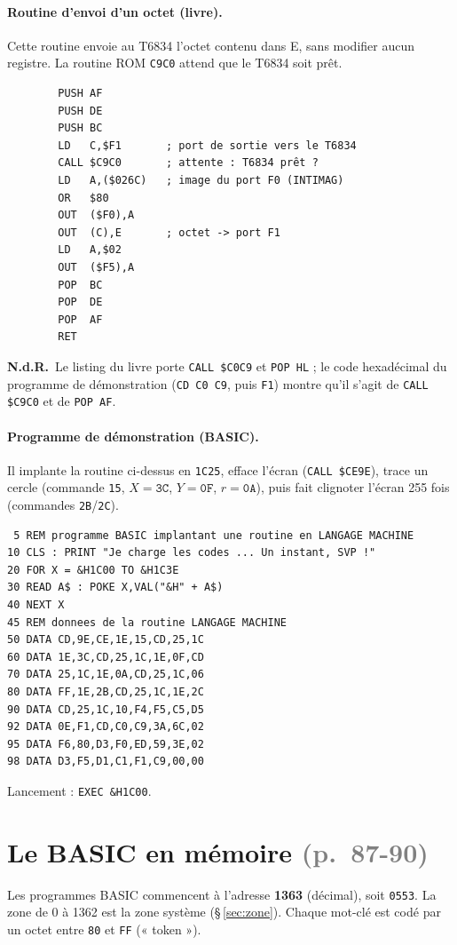 \documentclass[a4paper,10pt]{article}
\newcommand{\hex}[1]{\texttt{#1}}
\newcommand{\reg}[1]{\textsf{#1}}
\newcommand{\pg}[1]{\texorpdfstring{\textcolor{gray}{\small(p.~#1)}}{}}
\newcommand{\nota}[1]{\textcolor{red!60!black}{\small\textbf{N.d.R.}~#1}}
\begin{document}
\paragraph{Routine d'envoi d'un octet (livre).} Cette routine envoie au T6834
l'octet contenu dans \reg{E}, sans modifier aucun registre. La routine ROM
\hex{C9C0} attend que le T6834 soit prêt.
\begin{verbatim}
        PUSH AF
        PUSH DE
        PUSH BC
        LD   C,$F1       ; port de sortie vers le T6834
        CALL $C9C0       ; attente : T6834 prêt ?
        LD   A,($026C)   ; image du port F0 (INTIMAG)
        OR   $80
        OUT  ($F0),A
        OUT  (C),E       ; octet -> port F1
        LD   A,$02
        OUT  ($F5),A
        POP  BC
        POP  DE
        POP  AF
        RET
\end{verbatim}
\nota{Le listing du livre porte \texttt{CALL \$C0C9} et \texttt{POP HL} ; le
code hexadécimal du programme de démonstration (\texttt{CD C0 C9}, puis \texttt{F1})
montre qu'il s'agit de \texttt{CALL \$C9C0} et de \texttt{POP AF}.}

\paragraph{Programme de démonstration (BASIC).} Il implante la routine
ci-dessus en \hex{1C25}, efface l'écran (\texttt{CALL \$CE9E}), trace un cercle
(commande \hex{15}, $X=\hex{3C}$, $Y=\hex{0F}$, $r=\hex{0A}$), puis fait
clignoter l'écran 255 fois (commandes \hex{2B}/\hex{2C}).
\begin{verbatim}
 5 REM programme BASIC implantant une routine en LANGAGE MACHINE
10 CLS : PRINT "Je charge les codes ... Un instant, SVP !"
20 FOR X = &H1C00 TO &H1C3E
30 READ A$ : POKE X,VAL("&H" + A$)
40 NEXT X
45 REM donnees de la routine LANGAGE MACHINE
50 DATA CD,9E,CE,1E,15,CD,25,1C
60 DATA 1E,3C,CD,25,1C,1E,0F,CD
70 DATA 25,1C,1E,0A,CD,25,1C,06
80 DATA FF,1E,2B,CD,25,1C,1E,2C
90 DATA CD,25,1C,10,F4,F5,C5,D5
92 DATA 0E,F1,CD,C0,C9,3A,6C,02
95 DATA F6,80,D3,F0,ED,59,3E,02
98 DATA D3,F5,D1,C1,F1,C9,00,00
\end{verbatim}
Lancement : \texttt{EXEC \&H1C00}.

\section{Le BASIC en mémoire \pg{87-90}}

Les programmes BASIC commencent à l'adresse \textbf{1363} (décimal), soit
\hex{0553}. La zone de 0 à 1362 est la zone système (§\,\ref{sec:zone}).
Chaque mot-clé est codé par un octet entre \hex{80} et \hex{FF} (« token »).
\end{document}
